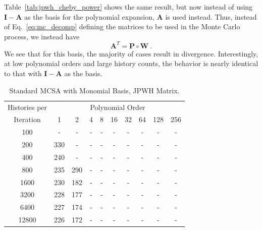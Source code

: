 \documentclass[10pt]{article}
\newcommand{\bA}{\ensuremath{\mathbf{A}}}
\newcommand{\bP}{\ensuremath{\mathbf{P}}}
\newcommand{\bW}{\ensuremath{\mathbf{W}}}
\newcommand{\bI}{\ensuremath{\mathbf{I}}}
\begin{document}
Table~\ref{tab:jpwh_cheby_power} shows the same result,
but now instead of using $\bI - \bA$ as the basis for the
polynomial expansion, $\bA$ is used instead.  
Thus, instead of Eq.~\eqref{eq:mc_decomp} defining the
matrices to be used in the Monte Carlo process, we instead
have
\begin{equation}
\bA^T = \bP \circ \bW \:.
\end{equation}
We see that
for this basis, the majority of cases result in divergence.
Interestingly, at low polynomial orders and large history
counts, the behavior is nearly identical to that with 
$\bI - \bA$ as the basis.
\begin{table}
\caption{Standard MCSA with Monomial Basis, JPWH Matrix. 
\label{tab:jpwh_standard_power}}
\centering
\begin{tabular}{cccccccccc}
\toprule
Histories per & \multicolumn{9}{c}{Polynomial Order} \\
Iteration & 1 & 2 & 4 & 8 & 16 & 32 & 64 & 128 & 256 \\
\midrule
    100 & -     & -     & - & - & - & - & - & - & - \\
    200 & 330 & -     & - & - & - & - & - & - & - \\
    400 & 240 & -     & - & - & - & - & - & - & - \\
    800 & 235 & 290 & - & - & - & - & - & - & - \\
  1600 & 230 & 182 & - & - & - & - & - & - & - \\
  3200 & 228 & 177 & - & - & - & - & - & - & - \\
  6400 & 227 & 174 & - & - & - & - & - & - & - \\
12800 & 226 & 172 & - & - & - & - & - & - & - \\
\bottomrule
\end{tabular}
\end{table}
\end{document}
